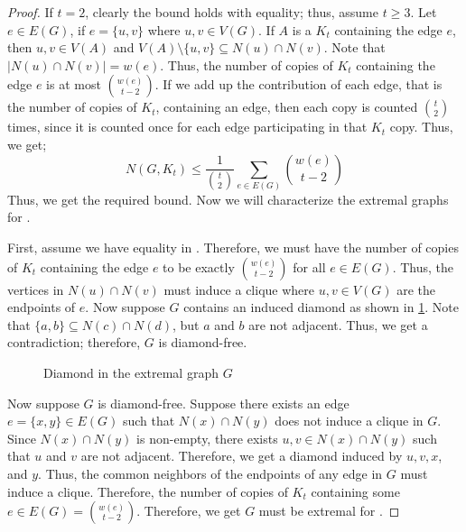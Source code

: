 \documentclass[pdflatex,sn-basic,Numbered]{sn-jnl}
\begin{document}
    \begin{proof}
    If $t =2$, clearly the bound holds with equality; thus, assume $t \geq 3$. Let $e \in E(G)$, if $e = \{u,v\}$ where $u,v \in V(G)$. If $A$ is a $K_t$ containing the edge $e$, then $u,v \in V(A)$ and $V(A)\setminus\{u,v\} \subseteq N(u) \cap N(v)$. Note that $|N(u)\cap N(v)| = w(e)$. Thus, the number of copies of $K_t$ containing the edge $e$ is at most ${w(e) \choose t-2}$. If we add up the contribution of each edge, that is the number of copies of $K_t$, containing an edge, then each copy is counted ${t\choose 2}$ times, since it is counted once for each edge participating in that $K_t$ copy. Thus, we get;
    \begin{equation}\label{e1}
        N(G,K_t) \leq \frac{1}{{t\choose 2}}\sum_{e\in E(G)}{w(e) \choose t-2}
    \end{equation}
Thus, we get the required bound. Now we will characterize the extremal graphs for .
    
    
    First, assume we have equality in . Therefore, we must have the number of copies of $K_t$ containing the edge $e$ to be exactly ${w(e) \choose t-2}$ for all $e \in E(G)$. Thus, the vertices in $N(u)\cap N(v)$ must induce a clique where $u,v \in V(G)$ are the endpoints of $e$. Now suppose $G$ contains an induced diamond as shown in \cref{diamond}. Note that $\{a,b\} \subseteq N(c)\cap N(d)$, but $a$ and $b$ are not adjacent. Thus, we get a contradiction; therefore, $G$ is diamond-free.

    \begin{figure}[H]
        \centering
        \caption{Diamond in the extremal graph $G$}
        \label{diamond}
    \end{figure}

    Now suppose $G$ is diamond-free. Suppose there exists an edge $e =\{x,y\} \in E(G)$ such that $N(x)\cap N(y)$ does not induce a clique in $G$. Since $N(x)\cap N(y)$ is non-empty, there exists $u,v \in N(x) \cap N(y)$ such that $u$ and $v$ are not adjacent. Therefore, we get a diamond induced by $u,v,x$, and $y$. Thus, the common neighbors of the endpoints of any edge in $G$ must induce a clique. Therefore, the number of copies of $K_t$ containing some $e \in E(G) = {w(e) \choose t-2}$. Therefore, we get $G$ must be extremal for .
     \end{proof}
\end{document}

